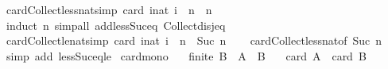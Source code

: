 \begin{isabellebody}
\endisatagproof
{\isafoldproof}%
%
\isadelimproof
\isanewline
%
\endisadelimproof
\isanewline
{}\isamarkupfalse%
\ card{\isacharunderscore}{\kern0pt}Collect{\isacharunderscore}{\kern0pt}less{\isacharunderscore}{\kern0pt}nat{\isacharbrackleft}{\kern0pt}simp{\isacharbrackright}{\kern0pt}{\isacharcolon}{\kern0pt}\ {\isachardoublequoteopen}card\ {\isacharbraceleft}{\kern0pt}i{\isacharcolon}{\kern0pt}{\isacharcolon}{\kern0pt}nat{\isachardot}{\kern0pt}\ i\ {\isacharless}{\kern0pt}\ n{\isacharbraceright}{\kern0pt}\ {\isacharequal}{\kern0pt}\ n{\isachardoublequoteclose}\isanewline
%
\isadelimproof
\ \ %
\endisadelimproof
%
\isatagproof
{}\isamarkupfalse%
\ {\isacharparenleft}{\kern0pt}induct\ n{\isacharparenright}{\kern0pt}\ {\isacharparenleft}{\kern0pt}simp{\isacharunderscore}{\kern0pt}all\ add{\isacharcolon}{\kern0pt}less{\isacharunderscore}{\kern0pt}Suc{\isacharunderscore}{\kern0pt}eq\ Collect{\isacharunderscore}{\kern0pt}disj{\isacharunderscore}{\kern0pt}eq{\isacharparenright}{\kern0pt}%
\endisatagproof
{\isafoldproof}%
%
\isadelimproof
\isanewline
%
\endisadelimproof
\isanewline
{}\isamarkupfalse%
\ card{\isacharunderscore}{\kern0pt}Collect{\isacharunderscore}{\kern0pt}le{\isacharunderscore}{\kern0pt}nat{\isacharbrackleft}{\kern0pt}simp{\isacharbrackright}{\kern0pt}{\isacharcolon}{\kern0pt}\ {\isachardoublequoteopen}card\ {\isacharbraceleft}{\kern0pt}i{\isacharcolon}{\kern0pt}{\isacharcolon}{\kern0pt}nat{\isachardot}{\kern0pt}\ i\ {\isasymle}\ n{\isacharbraceright}{\kern0pt}\ {\isacharequal}{\kern0pt}\ Suc\ n{\isachardoublequoteclose}\isanewline
%
\isadelimproof
\ \ %
\endisadelimproof
%
\isatagproof
{}\isamarkupfalse%
\ card{\isacharunderscore}{\kern0pt}Collect{\isacharunderscore}{\kern0pt}less{\isacharunderscore}{\kern0pt}nat{\isacharbrackleft}{\kern0pt}of\ {\isachardoublequoteopen}Suc\ n{\isachardoublequoteclose}{\isacharbrackright}{\kern0pt}\ \isamarkupfalse%
\ {\isacharparenleft}{\kern0pt}simp\ add{\isacharcolon}{\kern0pt}\ less{\isacharunderscore}{\kern0pt}Suc{\isacharunderscore}{\kern0pt}eq{\isacharunderscore}{\kern0pt}le{\isacharparenright}{\kern0pt}%
\endisatagproof
{\isafoldproof}%
%
\isadelimproof
\isanewline
%
\endisadelimproof
\isanewline
{}\isamarkupfalse%
\ card{\isacharunderscore}{\kern0pt}mono{\isacharcolon}{\kern0pt}\isanewline
\ \ \ {\isachardoublequoteopen}finite\ B{\isachardoublequoteclose}\ \ {\isachardoublequoteopen}A\ {\isasymsubseteq}\ B{\isachardoublequoteclose}\isanewline
\ \ \ {\isachardoublequoteopen}card\ A\ {\isasymle}\ card\ B{\isachardoublequoteclose}\isanewline

\end{isabellebody}

